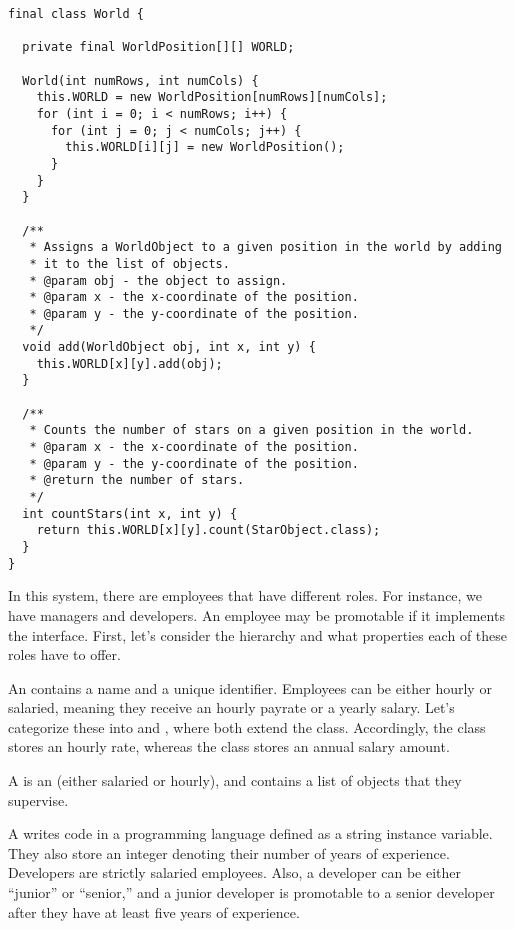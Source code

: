 \enlargethispage{-3\baselineskip}
\begin{lstlisting}[language=MyJava]
final class World {
  
  private final WorldPosition[][] WORLD;

  World(int numRows, int numCols) {
    this.WORLD = new WorldPosition[numRows][numCols];
    for (int i = 0; i < numRows; i++) {
      for (int j = 0; j < numCols; j++) {
        this.WORLD[i][j] = new WorldPosition();
      }
    }
  }

  /**
   * Assigns a WorldObject to a given position in the world by adding
   * it to the list of objects.
   * @param obj - the object to assign.
   * @param x - the x-coordinate of the position.
   * @param y - the y-coordinate of the position.
   */
  void add(WorldObject obj, int x, int y) {
    this.WORLD[x][y].add(obj);
  }

  /**
   * Counts the number of stars on a given position in the world.
   * @param x - the x-coordinate of the position.
   * @param y - the y-coordinate of the position.
   * @return the number of stars.
   */
  int countStars(int x, int y) {
    return this.WORLD[x][y].count(StarObject.class);
  }
}
\end{lstlisting}

In this system, there are employees that have different roles. 
For instance, we have managers and developers. 
An employee may be promotable if it implements the  interface. 
First, let's consider the hierarchy and what properties each of these roles have to offer.

An  contains a name and a unique identifier. 
Employees can be either hourly or salaried, meaning they receive an hourly payrate or a yearly salary. 
Let's categorize these into  and , where both extend the  class. 
Accordingly, the  class stores an hourly rate, whereas the  class stores an annual salary amount.

A  is an  (either salaried or hourly), and contains a list of  objects that they supervise. 

A  writes code in a programming language defined as a string instance variable. 
They also store an integer denoting their number of years of experience. 
Developers are strictly salaried employees. 
Also, a developer can be either ``junior'' or ``senior,'' and a junior developer is promotable to a senior developer after they have at least five years of experience.

